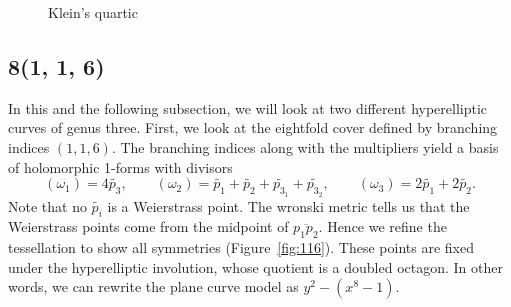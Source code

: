 \documentclass[12pt,reqno]{amsart}
\theoremstyle{definition}
\theoremstyle{remark}
\begin{document}
\begin{figure}[htbp]
    \centering
    \qquad
    \caption{Klein's quartic}%
    \label{fig:124}%
\end{figure}

\subsection*{8(1, 1, 6)}
In this and the following subsection, we will look at two different hyperelliptic curves of genus three. First, we look at the eightfold cover defined by branching indices $(1, 1, 6).$ The branching indices along with the multipliers yield a basis of holomorphic 1-forms with divisors $$(\omega_1) = 4 \widetilde{p_3}, \qquad (\omega_2) = \widetilde{p_1} + \widetilde{p_2} + \widetilde{p_{3_1}} + \widetilde{p_{3_2}}, \qquad (\omega_3) = 2 \widetilde{p_1} + 2 \widetilde{p_2}.$$ Note that no $\widetilde{p_i}$ is a Weierstrass point. The wronski metric tells us that the Weierstrass points come from the midpoint of $\overline{p_1 p_2}.$ Hence we refine the tessellation to show all symmetries (Figure~\ref{fig:116}). These points are fixed under the hyperelliptic involution, whose quotient is a doubled octagon. In other words, we can rewrite the plane curve model as $y^2 - (x^8 - 1).$ 
\end{document}

